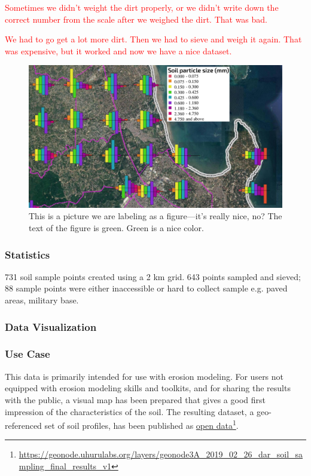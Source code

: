 \documentclass[a4paper,12pt,twoside]{article}
\begin{document}
\bigskip

\textcolor{red}{Sometimes we didn't weight the dirt properly, or we didn't write down the correct number from the scale after we weighed the dirt. That was bad. 

We had to go get a lot more dirt. Then we had to sieve and weigh it again. That was expensive, but it worked and now we have a nice dataset.}

\begin{figure}[h]
  \color{RHgreen}\caption{This is a picture we are labeling as a figure---it's really nice, no? The text of the figure is green. Green is a nice color.}
  \centering
  \includegraphics[width=1\textwidth]{soil_map_detail_peninsula_with_legend}
\end{figure}

\subsubsection{Statistics}
731 soil sample points created using a 2 km grid. 643 points sampled and sieved; 88 sample points were either inaccessible or hard to collect sample e.g. paved areas, military base.

\subsubsection{Data Visualization}

\subsubsection{Use Case}
This data is primarily intended for use with erosion modeling. For users not equipped with erosion modeling skills and toolkits, and for sharing the results with the public, a visual map has been prepared that gives a good first impression of the characteristics of the soil.
The resulting dataset, a geo-referenced set of soil profiles, has been published as \href{https://geonode.uhurulabs.org/layers/geonode3A_2019_02_26_dar_soil_sampling_final_results_v1}{open data}\footnote{\url{https://geonode.uhurulabs.org/layers/geonode3A_2019_02_26_dar_soil_sampling_final_results_v1}}.
\end{document}
